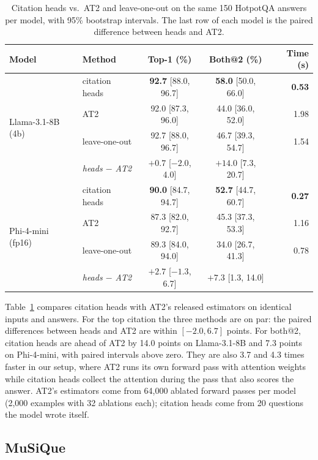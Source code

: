 \documentclass[11pt]{article}
\newcommand{\best}[1]{\textbf{#1}}
\begin{document}
\begin{table}[t]
\centering
\small
\caption{Citation heads vs.\ AT2 and leave-one-out on the same 150 HotpotQA answers per model, with 95\% bootstrap intervals. The last row of each model is the paired difference between heads and AT2.}
\label{tab:at2}
\begin{tabular}{llccr}
\toprule
Model & Method & Top-1 (\%) & Both@2 (\%) & Time (s) \\
\midrule
\multirow{4}{*}{Llama-3.1-8B (4b)} & citation heads & \best{92.7} [88.0, 96.7] & \best{58.0} [50.0, 66.0] & \best{0.53} \\
& AT2 & 92.0 [87.3, 96.0] & 44.0 [36.0, 52.0] & 1.98 \\
& leave-one-out & 92.7 [88.0, 96.7] & 46.7 [39.3, 54.7] & 1.54 \\
& \emph{heads $-$ AT2} & $+0.7$ [$-2.0$, 4.0] & $+14.0$ [7.3, 20.7] & \\
\midrule
\multirow{4}{*}{Phi-4-mini (fp16)} & citation heads & \best{90.0} [84.7, 94.7] & \best{52.7} [44.7, 60.7] & \best{0.27} \\
& AT2 & 87.3 [82.0, 92.7] & 45.3 [37.3, 53.3] & 1.16 \\
& leave-one-out & 89.3 [84.0, 94.0] & 34.0 [26.7, 41.3] & 0.78 \\
& \emph{heads $-$ AT2} & $+2.7$ [$-1.3$, 6.7] & $+7.3$ [1.3, 14.0] & \\
\bottomrule
\end{tabular}
\end{table}

Table~\ref{tab:at2} compares citation heads with AT2's released estimators on identical inputs and answers. For the top citation the three methods are on par: the paired differences between heads and AT2 are within $[-2.0, 6.7]$ points. For both@2, citation heads are ahead of AT2 by 14.0 points on Llama-3.1-8B and 7.3 points on Phi-4-mini, with paired intervals above zero. They are also 3.7 and 4.3 times faster in our setup, where AT2 runs its own forward pass with attention weights while citation heads collect the attention during the pass that also scores the answer. AT2's estimators come from 64{,}000 ablated forward passes per model (2{,}000 examples with 32 ablations each); citation heads come from 20 questions the model wrote itself.

\subsection{MuSiQue}
\label{sec:musique}
\end{document}
